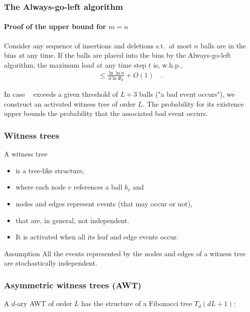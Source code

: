 \documentclass[professionalfonts]{beamer}
\DeclareMathOperator{\load}{L_{\max}} %
\DeclareMathOperator{\loadAgl}{L_{\max}^{Agl}}
\begin{document}
\begin{frame}
\frametitle{The Always-go-left algorithm}
\framesubtitle{Proof of the upper bound for $m=n$}
\begin{theorem}[V\"ocking, 2003]
\label{theorem:aglm}
Consider any sequence of insertions and deletions s.t.~at most $n$ balls are in the bins at any time. If the balls are placed into the bins by the Always-go-left algorithm, the maximum load at any time step $t$ is, w.h.p., 
\begin{align*}
\loadAgl \leq \frac{\ln \ln n}{d \ln \Phi_d} + O(1) \quad .
\end{align*}
\end{theorem}

\bigskip
In case $\load$ exceeds a given threshold of $L+3$ balls ("a bad event occurs"), we construct an activated \alert{witness tree of order $L$}. The probability for its existence upper bounds the probability that the associated bad event occurs.  
\end{frame}

\newcommand\assumptionOne{
\begin{alertblock}{Assumption}
All the events represented by the nodes and edges of a witness tree are stochastically independent. 
\end{alertblock}
}

\begin{frame}
\frametitle{Witness trees}
A witness tree
\begin{itemize}
\item is a \alert{tree-like structure},
\item where each node $v$ references a ball $b_v$ and
\item nodes and edges represent \alert{events} (that may occur or not),
\item that are, in general, \alert{not independent}.
\item It is \alert{activated} when all its leaf and edge events occur. 
\end{itemize}

\bigskip
\assumptionOne
\end{frame}

\begin{frame}
\frametitle{Asymmetric witness trees (AWT)} 
A $d$-ary AWT of order $L$ has the structure of a Fibonacci tree $T_d(dL+1)$:

\begin{center}
\end{center}
\end{frame}
\end{document}
